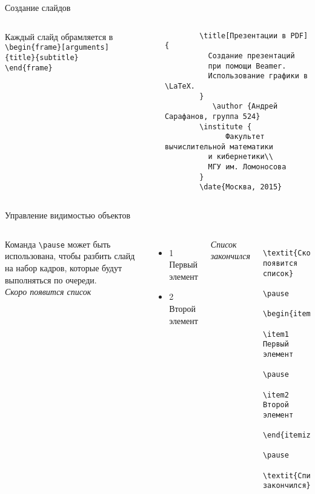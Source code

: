 \documentclass{beamer}
\newcommand{\bs}{\textbackslash}
\begin{document}
\begin{frame}[fragile]{Создание слайдов}
  \begin{columns}
      Каждый слайд обрамляется в
      \texttt{
        \bs begin\{frame\}[arguments]\\\{title\}\{subtitle\}
        \\[1\baselineskip]
        \bs end\{frame\}
        }
      \begin{verbatim}
        \title[Презентации в PDF] {
          Создание презентаций 
          при помощи Beamer. 
          Использование графики в \LaTeX.
        }
           \author {Андрей Сарафанов, группа 524}
        \institute {
              Факультет вычислительной математики 
          и кибернетики\\
          МГУ им. Ломоносова
        }
        \date{Москва, 2015}
      \end{verbatim}
  \end{columns}
\end{frame}

\begin{frame}[fragile]{Управление видимостью объектов}
  \begin{columns}
      Команда \texttt{\bs pause} может быть использована, чтобы разбить слайд на набор кадров, которые будут выполняться по очереди.\\
      \textit{Скоро появится список}
      \pause
      \begin{itemize}
        \item1 Первый элемент
        \pause
        \item2 Второй элемент
      \end{itemize}
      \pause
      \textit{Список закончился}
    \onslide
      \begin{verbatim}
      \textit{Скоро появится список}
      \pause
      \begin{itemize}
        \item1 Первый элемент
        \pause
        \item2 Второй элемент
      \end{itemize}
      \pause
      \textit{Список закончился}
      \end{verbatim}
  \end{columns}
\end{frame}
\end{document}
